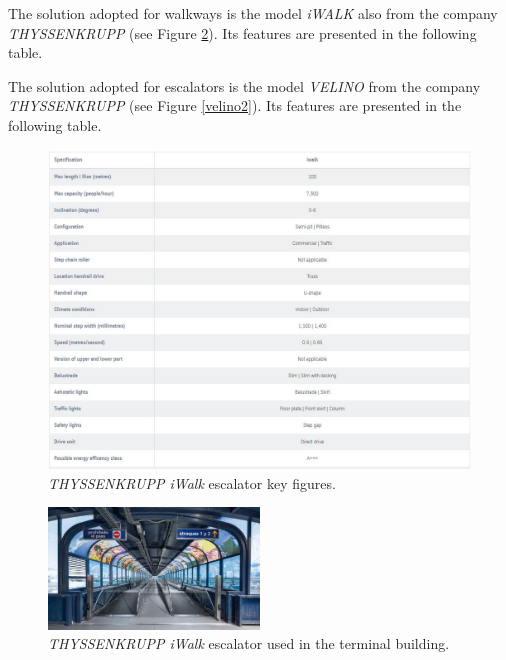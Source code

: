 The solution adopted for walkways is the model \textit{iWALK} also from the company \textit{THYSSENKRUPP} (see Figure \ref{iwalk2}). Its features are presented in the following table.

The solution adopted for escalators is the model \textit{VELINO} from the company \textit{THYSSENKRUPP} (see Figure \ref{velino2}). Its features are presented in the following table.

\begin{figure}[H]
	\centering
	\includegraphics[clip, trim=0cm 0cm 0cm 0cm, width=1\textwidth]{./images/indoorclosures/iwalk}
	\caption{\textit{THYSSENKRUPP iWalk} escalator key figures.}
	\label{iwalk}
\end{figure}

\begin{figure}[H]
	\centering
	\includegraphics[clip, trim=0cm 0cm 0cm 0cm, width=0.5\textwidth]{./images/indoorclosures/iwalk2}
	\caption{\textit{THYSSENKRUPP iWalk} escalator used in the terminal building.}
	\label{iwalk2}
\end{figure}
